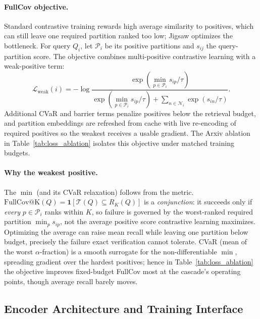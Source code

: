 \documentclass[runningheads]{llncs}
\begin{document}
\paragraph{FullCov objective.}
Standard contrastive training rewards high average similarity to positives, which can still leave one required partition ranked too low; Jigsaw optimizes the bottleneck. For query $Q_i$, let $\mathcal{P}_i$ be its positive partitions and $s_{ij}$ the query-partition score. The objective combines multi-positive contrastive learning with a weak-positive term:
\begin{equation}
\mathcal{L}_{\mathrm{weak}}(i)=-\log
\frac{\exp(\min_{p\in\mathcal{P}_i}s_{ip}/\tau)}
{\exp(\min_{p\in\mathcal{P}_i}s_{ip}/\tau)+\sum_{n\in\mathcal{N}_i}\exp(s_{in}/\tau)}.
\end{equation}
Additional CVaR and barrier terms penalize positives below the retrieval budget, and partition embeddings are refreshed from cache with live re-encoding of required positives so the weakest receives a usable gradient. The Arxiv ablation in Table~\ref{tab:loss_ablation} isolates this objective under matched training budgets.

\paragraph{Why the weakest positive.}
The $\min$ (and its CVaR relaxation) follows from the metric. $\mathrm{FullCov@K}(Q)=\mathbf{1}[\mathcal{T}(Q)\subseteq R_K(Q)]$ is a \emph{conjunction}: it succeeds only if \emph{every} $p\in\mathcal{P}_i$ ranks within $K$, so failure is governed by the worst-ranked required partition $\min_{p} s_{ip}$, not the average positive score contrastive learning maximizes. Optimizing the average can raise mean recall while leaving one partition below budget, precisely the failure exact verification cannot tolerate. CVaR (mean of the worst $\alpha$-fraction) is a smooth surrogate for the non-differentiable $\min$, spreading gradient over the hardest positives; hence in Table~\ref{tab:loss_ablation} the objective improves fixed-budget FullCov most at the cascade's operating points, though average recall barely moves.

\subsection{Encoder Architecture and Training Interface}
\end{document}
